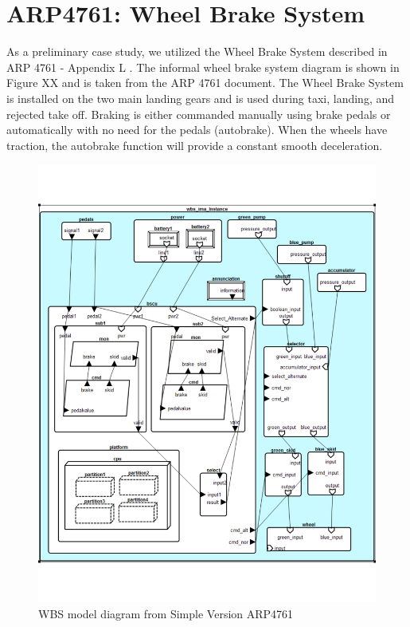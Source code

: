 \section{ARP4761: Wheel Brake System}

As a preliminary case study, we utilized the Wheel Brake System described in ARP 4761 - Appendix L \cite{AIR6110}. The informal wheel brake system diagram is shown in Figure XX and is taken from the ARP 4761 document. The Wheel Brake System is installed on the two main landing gears and is used during taxi, landing, and rejected take off. Braking is either commanded manually using brake pedals or automatically with no need for the pedals (autobrake). When the wheels have traction, the autobrake function will provide a constant smooth deceleration. \\

\begin{figure}[htb]
\begin{center}
\includegraphics[scale=.75]{images/Wbs-ima}
\caption{WBS model diagram from Simple Version ARP4761 }\label{fig:wbs_diagram}
\end{center}
\end{figure}


